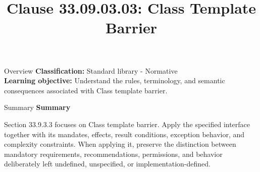 \documentclass[10pt,letterpaper]{article}
\title{Clause 33.09.03.03: Class Template Barrier}
\author{}
\date{}
\begin{document}
\maketitle
\begin{CornellOverviewBox}{Overview}
\textbf{Classification:} Standard library - Normative\\[2pt]
\textbf{Learning objective:} Understand the rules, terminology, and semantic consequences associated with Class template barrier.
\end{CornellOverviewBox}\begin{CornellSummaryBox}{Summary}
{\sffamily\bfseries\color{Accent} Summary}\par\vspace{3pt}Section 33.9.3.3 focuses on Class template barrier. Apply the specified interface together with its mandates, effects, result conditions, exception behavior, and complexity constraints. When applying it, preserve the distinction between mandatory requirements, recommendations, permissions, and behavior deliberately left undefined, unspecified, or implementation-defined.
\end{CornellSummaryBox}
\end{document}
